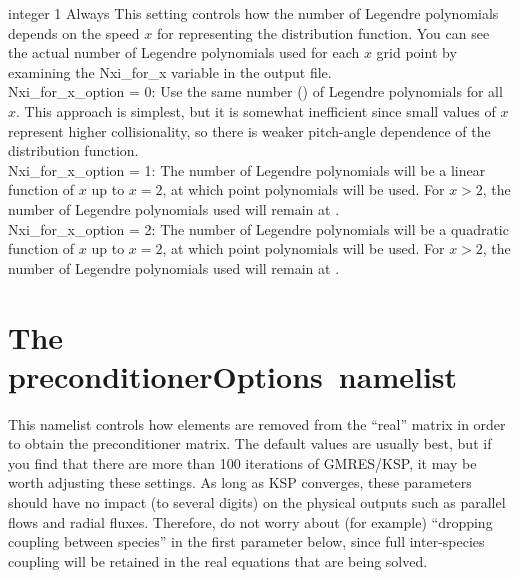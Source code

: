 {integer}
{1}
{Always}
{This setting controls how the number of Legendre polynomials depends on the speed $x$ for representing the distribution function.
You can see the actual number of Legendre polynomials used for each $x$ grid point by examining the {\ttfamily Nxi\_for\_x} variable
in the output file.\\

{\ttfamily Nxi\_for\_x\_option} = 0: Use the same number () of Legendre polynomials for all $x$.  This approach is
simplest, but it is somewhat inefficient since small values of $x$ represent higher collisionality, so there is weaker pitch-angle dependence
of the distribution function.\\

{\ttfamily Nxi\_for\_x\_option} = 1: The number of Legendre polynomials will be a linear function of $x$ up to $x=2$,
at which point  polynomials will be used. For $x>2$, the number of Legendre polynomials used will remain at .\\

{\ttfamily Nxi\_for\_x\_option} = 2: The number of Legendre polynomials will be a quadratic function of $x$ up to $x=2$,
at which point  polynomials will be used. For $x>2$, the number of Legendre polynomials used will remain at .\\

}









\section{The {\ttfamily preconditionerOptions}~namelist}
\label{sec:preconditionerOptions}

This namelist controls how elements are removed from the ``real'' matrix in order to obtain
the preconditioner matrix. The default values are usually best, but if you find that there are more than 100 iterations
of GMRES/KSP, it may be worth adjusting these settings.  As long as KSP converges, these parameters
should have no impact (to several digits) on the physical outputs such as parallel flows and radial fluxes.
Therefore, do not worry about (for example) ``dropping coupling between species'' in the first
parameter below, since full inter-species coupling will be retained in the real equations that are being solved.

